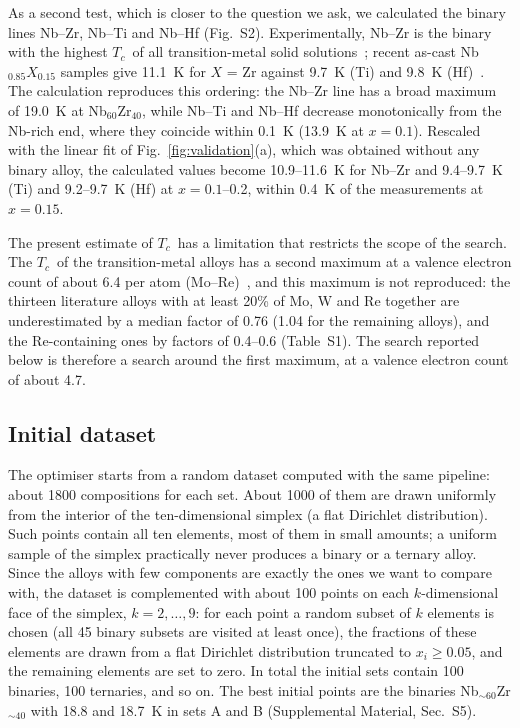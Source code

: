 \documentclass[aps,prb,reprint,superscriptaddress,twocolumn,floatfix]{revtex4-2}
\newcommand{\Tc}{$T_c$}
\newcommand{\SI}[1]{Supplemental Material, Sec.~#1}
\begin{document}
As a second test, which is closer to the question we ask, we calculated the binary lines
Nb--Zr, Nb--Ti and Nb--Hf (Fig.~S2). Experimentally, Nb--Zr is the
binary with the highest \Tc\ of all transition-metal solid solutions~\cite{Hulm1961};
recent as-cast Nb$_{0.85}X_{0.15}$ samples give 11.1~K for $X$ = Zr against 9.7~K (Ti) and
9.8~K (Hf)~\cite{Kushwaha2025}. The calculation reproduces this ordering: the Nb--Zr line
has a broad maximum of 19.0~K at Nb$_{60}$Zr$_{40}$, while Nb--Ti and Nb--Hf decrease
monotonically from the Nb-rich end, where they coincide within 0.1~K (13.9~K at $x = 0.1$).
Rescaled with the linear fit of Fig.~\ref{fig:validation}(a), which was obtained without
any binary alloy, the calculated values become 10.9--11.6~K for Nb--Zr and 9.4--9.7~K
(Ti) and 9.2--9.7~K (Hf) at $x = 0.1$--0.2, within 0.4~K of the measurements at $x = 0.15$.

The present estimate of \Tc\ has a limitation that restricts the scope of the search. The
\Tc\ of the transition-metal alloys has a second maximum at a valence electron count of about
6.4 per atom (Mo--Re)~\cite{Hulm1961}, and this maximum is not reproduced: the thirteen
literature alloys with at least 20\% of Mo, W and Re together are underestimated by a
median factor of 0.76 (1.04 for the remaining alloys), and the Re-containing ones by
factors of 0.4--0.6 (Table~S1). The search reported below is therefore a search around the
first maximum, at a valence electron count of about 4.7.

\subsection{Initial dataset}
\label{sec:init}

The optimiser starts from a random dataset computed with the same pipeline:
about 1800 compositions for each set. About 1000 of them are drawn
uniformly from the interior of the ten-dimensional simplex (a flat Dirichlet distribution).
Such points contain all ten elements, most of them in small amounts; a uniform sample of
the simplex practically never produces a binary or a ternary alloy. Since the alloys with
few components are exactly the ones we want to compare with, the dataset is complemented
with about 100 points on each $k$-dimensional face of the simplex, $k = 2, \dots, 9$:
for each point a random subset of $k$ elements is chosen (all 45 binary subsets are visited
at least once), the fractions of these elements are drawn from a flat Dirichlet distribution
truncated to $x_i \geq 0.05$, and the remaining elements are set to zero. In total the initial
sets contain 100 binaries, 100 ternaries, and so on. The best initial points are the
binaries Nb$_{\sim 60}$Zr$_{\sim 40}$ with 18.8 and 18.7~K in sets A and B
(\SI{S5}).
\end{document}
